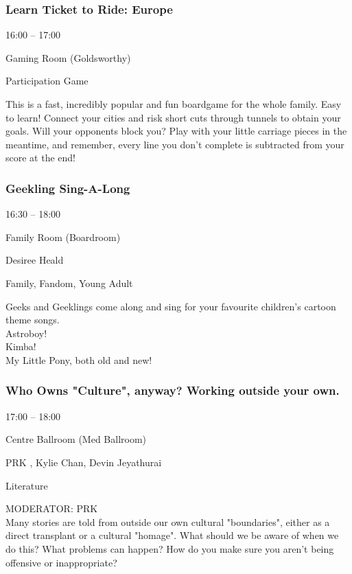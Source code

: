 \documentclass{scrreprt}
\begin{document}
\begin{multicols}{2}
\subsubsection*{Learn Ticket to Ride: Europe}\begin{description}
\setlength{\itemsep}{0pt}
\setlength{\parsep}{0pt}
\setlength{\parskip}{0pt}
\item[Time:]{16:00 -- 17:00}
\item[Venue:]{Gaming Room (Goldsworthy)}
\item[Tags:]{Participation Game}\end{description}
This is a fast, incredibly popular and fun boardgame for the whole family. Easy to learn! Connect your cities and risk short cuts through tunnels to obtain your goals. Will your opponents block you? Play with your little carriage pieces in the meantime, and remember, every line you don't complete is subtracted from your score at the end!
\subsubsection*{Geekling Sing-A-Long}\begin{description}
\setlength{\itemsep}{0pt}
\setlength{\parsep}{0pt}
\setlength{\parskip}{0pt}
\item[Time:]{16:30 -- 18:00}
\item[Venue:]{Family Room (Boardroom)}
\item[People:]{Desiree Heald}
\item[Tags:]{Family, Fandom, Young Adult}\end{description}
Geeks and Geeklings come along and sing for your favourite children's cartoon theme songs. \\Astroboy!\\Kimba!\\My Little Pony, both old and new!
\subsubsection*{Who Owns "Culture", anyway? Working outside your own.}\begin{description}
\setlength{\itemsep}{0pt}
\setlength{\parsep}{0pt}
\setlength{\parskip}{0pt}
\item[Time:]{17:00 -- 18:00}
\item[Venue:]{Centre Ballroom (Med Ballroom)}
\item[People:]{PRK , Kylie Chan, Devin Jeyathurai}
\item[Tags:]{Literature}\end{description}
MODERATOR: PRK\\Many stories are told from outside our own cultural "boundaries", either as a direct transplant or a cultural "homage". What should we be aware of when we do this? What problems can happen? How do you make sure you aren't being offensive or inappropriate?

\end{multicols}
\end{document}
